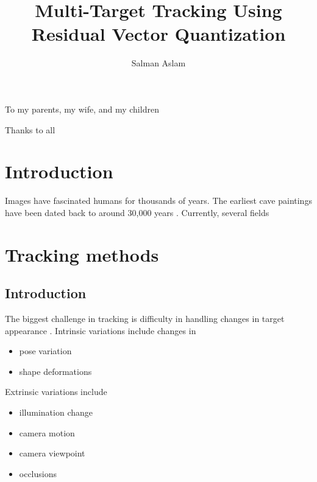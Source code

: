 \documentclass[12pt,letterpaper,doublespaced,ETD]{gt-ece-thesis} %
\title{Multi-Target Tracking Using Residual Vector Quantization}
\author{Salman Aslam}
\begin{document}
	
	\pagestyle{plain}
	

	\begin{FrontMatter}
		\contents %
	\end{FrontMatter}
	\begin{dedication}
		To my parents, my wife, and my children
	\end{dedication}
	\begin{acknowledgement}
		Thanks to all \newpage
	\end{acknowledgement}
	\begin{Body}	
		
\chapter{Introduction}
\label{chap_Introduction}	
\par
Images have fascinated humans for thousands of years.  The earliest cave paintings have been dated back to around 30,000 years \cite{2009_WEB_EarliestHumanPaintings_Gray}.  Currently, several fields 




\chapter{Tracking methods}
\label{chap_tracking_methods}	
\section{Introduction}
The biggest challenge in tracking is difficulty in handling changes in target appearance \cite{2008_JNL_subspaceTRK_Ross}.  Intrinsic variations include changes in 

\begin{itemize}
\item pose variation
\item shape deformations
\end{itemize} 

Extrinsic variations include

\begin{itemize}
\item illumination change
\item camera motion
\item camera viewpoint 
\item occlusions
\end{itemize}


\end{Body}
\end{document}
